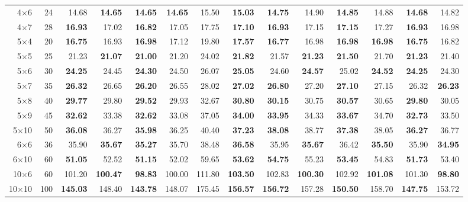 \begin{table}[t]
\begin{tabular}{rrrrrrrrrrrrrr}
4$\times$6 & 24 & 14.68 & \textbf{14.65} & \textbf{14.65} & \textbf{14.65} & 15.50 & \textbf{15.03} & \textbf{14.75} & 14.90 & \textbf{14.85} & 14.88 & \textbf{14.68} & 14.82 \\
4$\times$7 & 28 & \textbf{16.93} & 17.02 & \textbf{16.82} & 17.05 & 17.75 & \textbf{17.10} & \textbf{16.93} & 17.15 & \textbf{17.15} & 17.27 & \textbf{16.93} & 16.98 \\
5$\times$4 & 20 & \textbf{16.75} & 16.93 & \textbf{16.98} & 17.12 & 19.80 & \textbf{17.57} & \textbf{16.77} & 16.98 & \textbf{16.98} & \textbf{16.98} & \textbf{16.75} & 16.82 \\
5$\times$5 & 25 & 21.23 & \textbf{21.07} & \textbf{21.00} & 21.20 & 24.02 & \textbf{21.82} & 21.57 & \textbf{21.23} & \textbf{21.50} & 21.70 & \textbf{21.23} & 21.40 \\
5$\times$6 & 30 & \textbf{24.25} & 24.45 & \textbf{24.30} & 24.50 & 26.07 & \textbf{25.05} & 24.60 & \textbf{24.57} & 25.02 & \textbf{24.52} & \textbf{24.25} & 24.30 \\
5$\times$7 & 35 & \textbf{26.32} & 26.65 & \textbf{26.20} & 26.55 & 28.02 & \textbf{27.02} & \textbf{26.80} & 27.20 & \textbf{27.10} & 27.15 & 26.32 & \textbf{26.23} \\
5$\times$8 & 40 & \textbf{29.77} & 29.80 & \textbf{29.52} & 29.93 & 32.67 & \textbf{30.80} & \textbf{30.15} & 30.75 & \textbf{30.57} & 30.65 & \textbf{29.80} & 30.05 \\
5$\times$9 & 45 & \textbf{32.62} & 33.38 & \textbf{32.62} & 33.08 & 37.05 & \textbf{34.00} & \textbf{33.95} & 34.33 & \textbf{33.67} & 34.70 & \textbf{32.73} & 33.50 \\
5$\times$10 & 50 & \textbf{36.08} & 36.27 & \textbf{35.98} & 36.25 & 40.40 & \textbf{37.23} & \textbf{38.08} & 38.77 & \textbf{37.38} & 38.05 & \textbf{36.27} & 36.77 \\
6$\times$6 & 36 & 35.90 & \textbf{35.67} & \textbf{35.27} & 35.70 & 38.48 & \textbf{36.58} & 35.95 & \textbf{35.67} & 36.42 & \textbf{35.50} & 35.90 & \textbf{34.95} \\
6$\times$10 & 60 & \textbf{51.05} & 52.52 & \textbf{51.15} & 52.02 & 59.65 & \textbf{53.62} & \textbf{54.75} & 55.23 & \textbf{53.45} & 54.83 & \textbf{51.73} & 53.40 \\
10$\times$6 & 60 & 101.20 & \textbf{100.47} & \textbf{98.83} & 100.00 & 111.80 & \textbf{103.50} & 102.83 & \textbf{100.30} & 102.92 & \textbf{101.08} & 101.30 & \textbf{98.80} \\
10$\times$10 & 100 & \textbf{145.03} & 148.40 & \textbf{143.78} & 148.07 & 175.45 & \textbf{156.57} & \textbf{156.72} & 157.28 & \textbf{150.50} & 158.70 & \textbf{147.75} & 153.72 \\
\bottomrule
\end{tabular}
\end{table}